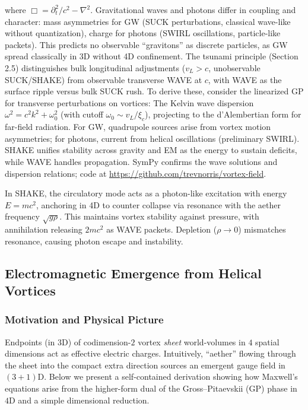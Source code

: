 where $\Box = \partial_t^2 / c^2 - \nabla^2$. Gravitational waves and photons differ in coupling and character: mass asymmetries for GW (SUCK perturbations, classical wave-like without quantization), charge for photons (SWIRL oscillations, particle-like packets). This predicts no observable ``gravitons'' as discrete particles, as GW spread classically in 3D without 4D confinement. The tsunami principle (Section 2.5) distinguishes bulk longitudinal adjustments ($v_L > c$, unobservable SUCK/SHAKE) from observable transverse WAVE at $c$, with WAVE as the surface ripple versus bulk SUCK rush. To derive these, consider the linearized GP for transverse perturbations on vortices: The Kelvin wave dispersion $\omega^2 = c^2 k^2 + \omega_0^2$ (with cutoff $\omega_0 \sim v_L / \xi_c$), projecting to the d'Alembertian form for far-field radiation. For GW, quadrupole sources arise from vortex motion asymmetries; for photons, current from helical oscillations (preliminary SWIRL). SHAKE unifies stability across gravity and EM as the energy to sustain deficits, while WAVE handles propagation. SymPy confirms the wave solutions and dispersion relations; code at \url{https://github.com/trevnorris/vortex-field}.

In SHAKE, the circulatory mode acts as a photon-like excitation with energy $E = mc^2$, anchoring in 4D to counter collapse via resonance with the aether frequency $\sqrt{g \rho}$. This maintains vortex stability against pressure, with annihilation releasing $2mc^2$ as WAVE packets. Depletion ($\rho \to 0$) mismatches resonance, causing photon escape and instability.


\subsection{Electromagnetic Emergence from Helical Vortices}
\label{sec:EM-from-helical-vortices}

\subsubsection{Motivation and Physical Picture}
Endpoints (in 3D) of codimension-$2$ vortex \emph{sheet} world-volumes in $4$ spatial dimensions act as effective electric charges. Intuitively, ``aether'' flowing through the sheet into the compact extra direction sources an emergent gauge field in $(3{+}1)$D. Below we present a self-contained derivation showing how Maxwell's equations arise from the higher-form dual of the Gross--Pitaevskii (GP) phase in $4$D and a simple dimensional reduction.

